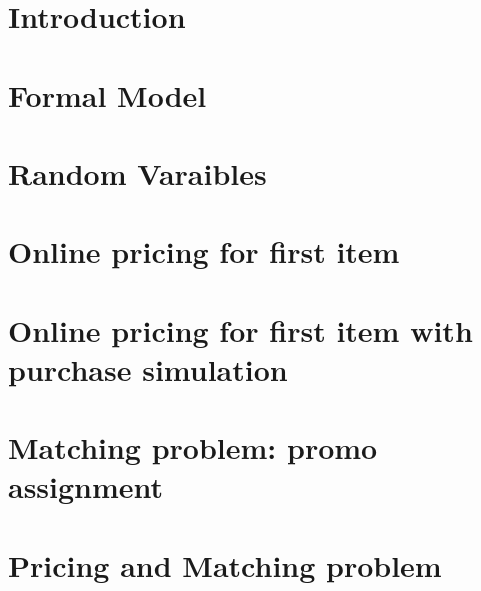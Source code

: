 
\usepackage{amsfonts}
\usepackage{amsmath}
\DeclareMathOperator{\argmax}{arg\,max}

	
	\tableofcontents
    \clearpage
	\section*{Introduction}
    \label{sect:Introduction}
		
    \section*{Formal Model}
    \label{sect:Formal Model}
		
    \section*{Random Varaibles}
    \label{sect:Random Variables}
			
    \section*{Online pricing for first item}
    \label{sect:Online pricing for first item}
		
    \section*{Online pricing for first item with purchase simulation}
    \label{sect:Online pricing for first item with purchase simulation}
		
    \section*{Matching problem: promo assignment}
    \label{sect:Matching problem: promo assignment}
		
    \section*{Pricing and Matching problem}
    \label{sect:Pricing and Matching problem}
		
